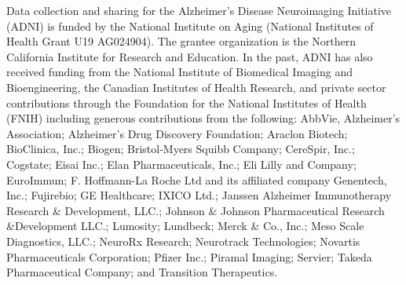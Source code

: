 \documentclass[a4paper, 12pt]{article}
\begin{document}
Data collection and sharing for the Alzheimer's Disease Neuroimaging Initiative (ADNI) is funded by the National
Institute on Aging (National Institutes of Health Grant U19 AG024904). The grantee organization is the Northern
California Institute for Research and Education. In the past, ADNI has also received funding from the National
Institute of Biomedical Imaging and Bioengineering, the Canadian Institutes of Health Research, and private
sector contributions through the Foundation for the National Institutes of Health (FNIH) including generous
contributions from the following: AbbVie, Alzheimer’s Association; Alzheimer’s Drug Discovery Foundation;
Araclon Biotech; BioClinica, Inc.; Biogen; Bristol-Myers Squibb Company; CereSpir, Inc.; Cogstate; Eisai Inc.;
Elan Pharmaceuticals, Inc.; Eli Lilly and Company; EuroImmun; F. Hoffmann-La Roche Ltd and its affiliated
company Genentech, Inc.; Fujirebio; GE Healthcare; IXICO Ltd.; Janssen Alzheimer Immunotherapy Research \&
Development, LLC.; Johnson \& Johnson Pharmaceutical Research \&Development LLC.; Lumosity; Lundbeck;
Merck \& Co., Inc.; Meso Scale Diagnostics, LLC.; NeuroRx Research; Neurotrack Technologies; Novartis
Pharmaceuticals Corporation; Pfizer Inc.; Piramal Imaging; Servier; Takeda Pharmaceutical Company; and
Transition Therapeutics.
\newpage



\end{document}
